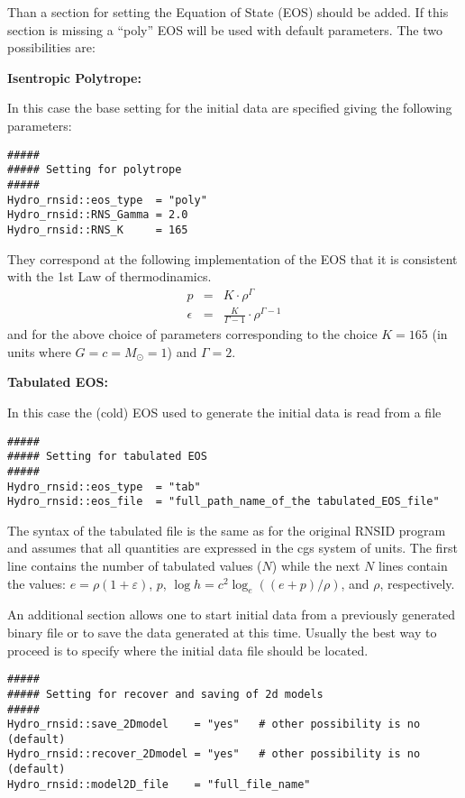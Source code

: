 Than a section for setting the Equation of State (EOS) should be added.
If this section is missing a ``poly'' EOS will be used with default parameters.
The two possibilities are:
\begin{description}
\item{\textbf{Isentropic Polytrope:}}
  
  In this case the base setting for the initial data are specified
  giving the following parameters:
\begin{verbatim}
#####
##### Setting for polytrope
#####
Hydro_rnsid::eos_type  = "poly"  
Hydro_rnsid::RNS_Gamma = 2.0
Hydro_rnsid::RNS_K     = 165   
\end{verbatim}
They correspond at the following implementation of the EOS
that it is consistent with the 1st Law of thermodinamics.
\begin{eqnarray}
   p         &=& K \cdot \rho^\Gamma \\
   \epsilon &=& \frac{K}{\Gamma-1} \cdot \rho^{\Gamma-1} 
\end{eqnarray}
and for the above choice of parameters corresponding to the choice $K=165$ (in units where $G=c=M_\odot=1$) and $\Gamma=2$.

\item{\textbf{Tabulated EOS:}}

  In this case the (cold) EOS used to
  generate the initial data is read from a file

\begin{verbatim}
#####
##### Setting for tabulated EOS
#####
Hydro_rnsid::eos_type  = "tab"   
Hydro_rnsid::eos_file  = "full_path_name_of_the tabulated_EOS_file"
\end{verbatim}
  The syntax of the tabulated file is the same as for the original
  RNSID program and assumes that all quantities are expressed in the
  cgs system of units. The first line contains the number of tabulated
  values ($N$) while the next $N$ lines contain the values:
  $e=\rho(1+\varepsilon)$, $p$, $\log h = c^2 \log_e((e+p)/\rho)$, and
  $\rho$, respectively.
\end{description}


An additional section allows one to start initial data from a
previously generated binary file or to save the data generated at this
time. Usually the best way to proceed is to specify where the initial
data file should be located.
\begin{verbatim}
#####
##### Setting for recover and saving of 2d models 
#####
Hydro_rnsid::save_2Dmodel    = "yes"   # other possibility is no (default)
Hydro_rnsid::recover_2Dmodel = "yes"   # other possibility is no (default)
Hydro_rnsid::model2D_file    = "full_file_name"
\end{verbatim}

